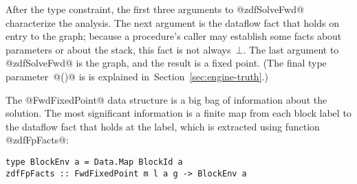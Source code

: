 \documentclass[blockstyle,preprint,natbib,nocopyrightspace]{sigplanconf}
\newcommand\secref[1]{Section~\ref{sec:#1}}
\begin{document}
After the type constraint, 
the first three arguments to @zdfSolveFwd@ characterize the analysis.
The next argument is the dataflow fact that holds on entry to the
graph;
because a procedure's caller may establish some facts about
parameters or about the stack,
this fact
is not always~$\bot$.
The last argument to @zdfSolveFwd@ is the graph, and the result is a 
fixed point.
({The final type parameter~@()@ is 
is explained in~\secref{engine-truth}.})


The @FwdFixedPoint@ data structure is a big bag
of information about the solution.
The most significant information is
a finite map from each block label to the dataflow fact that holds at
the label, which is extracted using function @zdfFpFacts@:
\begin{verbatim}
type BlockEnv a = Data.Map BlockId a
zdfFpFacts :: FwdFixedPoint m l a g -> BlockEnv a
\end{verbatim}






\iffalse
\begin{code}
class DataflowSolverDirection
        transfers fixedpt where
  zdfSolveFrom :: (DebugNodes m l, Outputable a)
    => BlockEnv a        -- Init facts
    -> PassName          -- Analysis name
    -> DataflowLattice a -- Lattice
    -> transfers m l a   -- Transfers
    -> a                 -- Input fact
    -> Graph m l         -- CFG
    -> fixedpt m l a ()
\end{code}
\fi



\end{document}
